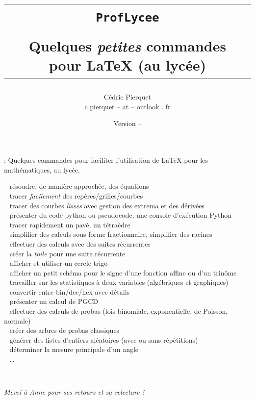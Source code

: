 \documentclass[a4paper,french,11pt]{article}
\title{%
\begin{minipage}{0.85\linewidth}
	\begin{tcolorbox}[colframe=yellow,colback=yellow!15]
		\begin{center}
			\begin{tabular}{c}
				\lstinline!ProfLycee!\\
				\\
				Quelques \textit{petites} commandes pour  \LaTeX{} (au lycée)
			\end{tabular}
		\end{center}
	\end{tcolorbox}
\end{minipage}
}
\author{
	\begin{tabular}{c}
		Cédric Pierquet\\
		{\ttfamily c pierquet -- at -- outlook . fr}
	\end{tabular}
}
\date{Version \PLversion{} -- \PLdate}
\newcommand\deblst{{\tiny\faCode}~}
\begin{document}
\pagestyle{fancy}

\maketitle

\thispagestyle{empty}

{ : Quelques commandes pour faciliter l'utilisation de \LaTeX{} pour les mathématiques, au lycée.}

\medskip

{\small\noindent%
{\deblst} résoudre, de manière approchée, des équations\\
{\deblst} tracer \textit{facilement} des repères/grilles/courbes\\
{\deblst} tracer  des courbes \textit{lisses} avec gestion des extrema et des dérivées\\
{\deblst} présenter du code \textsf{python} ou \textsf{pseudocode}, une console d'exécution \textsf{Python} \\
{\deblst} tracer rapidement un pavé, un tétraèdre \\
{\deblst} simplifier des calculs sous forme fractionnaire, simplifier des racines \\
{\deblst} effectuer des calculs avec des suites récurrentes \\
{\deblst} créer la \textit{toile} pour une suite récurrente \\
{\deblst} afficher et utiliser un cercle trigo \\
{\deblst} afficher un petit schéma pour le signe d'une fonction affine ou d'un trinôme \\
{\deblst} travailler sur les statistiques à deux variables (algébriques et graphiques) \\
{\deblst} convertir entre bin/dec/hex avec détails \\
{\deblst} présenter un calcul de PGCD \\
{\deblst} effectuer des calculs de probas (lois binomiale, exponentielle, de Poisson, normale) \\
{\deblst} créer des arbres de probas \og classiques \fg \\
{\deblst} générer des listes d'entiers aléatoires (avec ou sans répétitions)\\
{\deblst} déterminer la mesure principale d'un angle \\
{\deblst} \ldots}

~

\hfill{}\textsl{Merci à Anne pour ses retours et sa relecture !}
\end{document}
